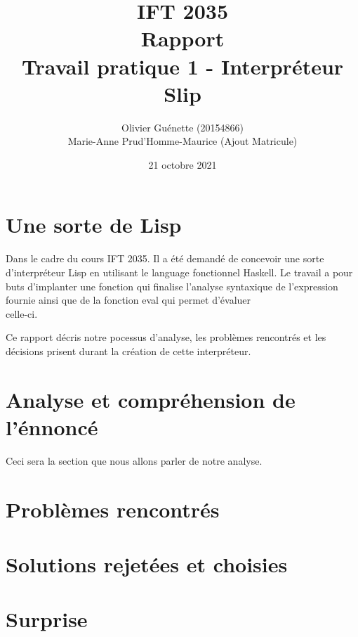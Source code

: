 \documentclass[12pt, letterpaper]{article}
\title{IFT 2035 \\ Rapport \\ Travail pratique 1 - Interpréteur Slip}
\author{Olivier Guénette (20154866) 
\\ Marie-Anne Prud'Homme-Maurice (Ajout Matricule)}
\date{21 octobre 2021}
\begin{document}
\maketitle

\section*{Une sorte de Lisp}

Dans le cadre du cours IFT 2035. Il a été demandé de concevoir une sorte 
d'interpréteur Lisp en utilisant le language fonctionnel Haskell. Le travail 
a pour buts d'implanter une fonction qui finalise l'analyse syntaxique de 
l'expression fournie ainsi que de la fonction eval qui permet 
d'évaluer \\ celle-ci.

Ce rapport décris notre pocessus d'analyse, les problèmes rencontrés 
et les décisions prisent durant la création de cette interpréteur.

\section{Analyse et compréhension de l'énnoncé}
Ceci sera la section que nous allons parler de notre analyse.

\section{Problèmes rencontrés}

\section{Solutions rejetées et choisies}

\section{Surprise}
\end{document}
